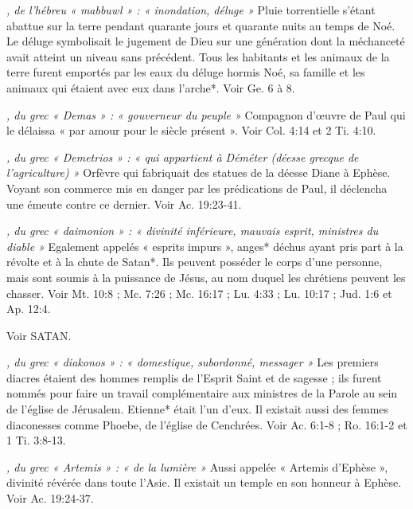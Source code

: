 \begin{multicols}{2}
\textit{, de l'hébreu « mabbuwl » : « inondation, déluge »}\newline
Pluie torrentielle s'étant abattue sur la terre pendant quarante jours et quarante nuits au temps de Noé. Le déluge symbolisait le jugement de Dieu sur une génération dont la méchanceté avait atteint un niveau sans précédent. Tous les habitants et les animaux de la terre furent emportés par les eaux du déluge hormis Noé, sa famille et les animaux qui étaient avec eux dans l'arche*. Voir Ge. 6 à 8.

\textit{, du grec « Demas » : « gouverneur du peuple »}\newline
Compagnon d'œuvre de Paul qui le délaissa « par amour pour le siècle présent ». Voir Col. 4:14 et 2 Ti. 4:10.

\textit{, du grec « Demetrios » : « qui appartient à Déméter (déesse grecque de l'agriculture) »}\newline
Orfèvre qui fabriquait des statues de la déesse Diane à Ephèse. Voyant son commerce mis en danger par les prédications de Paul, il déclencha une émeute contre ce dernier. Voir Ac. 19:23-41.

\textit{, du grec « daimonion » : « divinité inférieure, mauvais esprit, ministres du diable »}\newline
Egalement appelés « esprits impurs », anges* déchus ayant pris part à la révolte et à la chute de Satan*. Ils peuvent posséder le corps d'une personne, mais sont soumis à la puissance de Jésus, au nom duquel les chrétiens peuvent les chasser. Voir Mt. 10:8 ; Mc. 7:26 ; Mc. 16:17 ; Lu. 4:33 ; Lu. 10:17 ; Jud. 1:6 et Ap. 12:4.

\textit{}\newline
Voir SATAN.

\textit{, du grec « diakonos » : « domestique, subordonné, messager »}\newline
Les premiers diacres étaient des hommes remplis de l'Esprit Saint et de sagesse ; ils furent nommés pour faire un travail complémentaire aux ministres de la Parole au sein de l'église de Jérusalem. Etienne* était l'un d'eux. Il existait aussi des femmes diaconesses comme Phoebe, de l'église de Cenchrées. Voir Ac. 6:1-8 ; Ro. 16:1-2 et 1 Ti. 3:8-13.

\textit{, du grec « Artemis » : « de la lumière »}\newline
Aussi appelée « Artemis d'Ephèse », divinité révérée dans toute l'Asie. Il existait un temple en son honneur à Ephèse. Voir Ac. 19:24-37.


\end{multicols}
